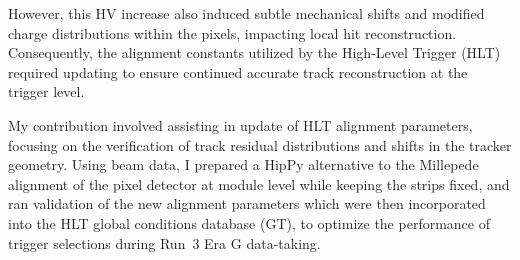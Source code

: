 However, this HV increase also induced subtle mechanical shifts and modified charge distributions within the pixels, impacting local hit reconstruction. Consequently, the alignment constants utilized by the High-Level Trigger (HLT) required updating to ensure continued accurate track reconstruction at the trigger level. 


My contribution involved assisting in update of HLT alignment parameters, focusing on the verification of track residual distributions and shifts in the tracker geometry. Using beam data, I prepared a HipPy alternative to the Millepede alignment of the pixel detector at module level while keeping the strips fixed, and ran validation of the new alignment parameters which were then incorporated into the HLT global conditions database (GT), to optimize the performance of trigger selections during Run~3 Era G data-taking.


